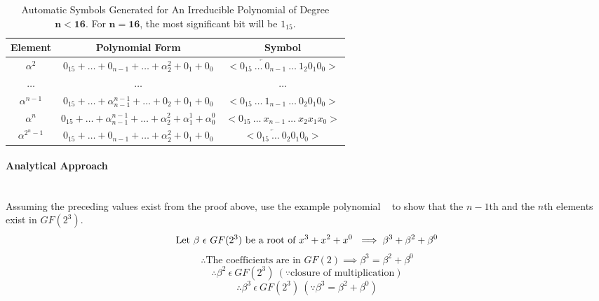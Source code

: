   \begin{table}[h]
        \def\arraystretch{2.5}
        \caption{Automatic Symbols Generated for An Irreducible Polynomial of
        Degree $\bm{n < 16}$. For $\bm{n = 16}$, the most significant bit will
        be $1_{15}$.}
        \centering
        \begin{tabular*}{450pt}{@{\extracolsep{\fill}} ccc}

        \textbf{Element} & \textbf{Polynomial Form} & \textbf{Symbol}
        \\
        \hline

        $\alpha^{2}$ & $0_{15} + \ldots + 0_{n-1} + \ldots +
        \alpha^{2}_{2} + 0_{1} + 0_{0}$ & $< \overleftarrow{0_{15} \ \ldots \
        0_{n-1}} \ \ldots \ 1_{2} 0_{1} 0_{0} >$ \\

        $\ldots$ & $\ldots$ & $\ldots$ \\

        $\alpha^{n-1}$ & $0_{15} + \ldots + \alpha^{n-1}_{n-1} + \ldots
        + 0_{2} + 0_{1} + 0_{0}$ & $< 0_{15} \ \ldots \ 1_{n-1} \ \ldots \
          0_{2} 0_{1} 0_{0} >$ \\

        $\alpha^{n}$ & $0_{15} + \ldots + \alpha^{n-1}_{n-1} + \ldots
        +\alpha^{2}_{2} + \alpha^{1}_{1} + \alpha^{0}_{0}$ & $< 0_{15} \ 
        \ldots \ x_{n-1} \ \ldots \ x_{2} x_{1} x_{0} >$ \\

        $\alpha^{2^{n}-1}$ & $0_{15} + \ldots + 0_{n-1} + \ldots +
        \alpha^{2}_{2} + 0_{1} + 0_{0}$ & $< \overleftarrow{0_{15} \ \ldots \
        0_{2}} 0_{1} 0_{0} >$ \\

        \end{tabular*}
        \label{table:auto_sym}
    \end{table}

        \paragraph{Analytical Approach} \leavevmode \\ Assuming the preceding
        values exist from the proof above, use the example polynomial
        \examplepoly~ to show that the $n-1$th and the $n$th elements exist in
        $GF(2^{3})$.
        \[ \text{Let } \beta \ \epsilon \ GF(2^{3}) \text{ be a root of
        $x^{3}+x^{2}+x^{0}$~} \implies \beta^{3} + \beta^{2} + \beta^{0} \]
        \[ \therefore \text{The coefficients are in } GF(2) \implies
        \beta^{3} = \beta^{2} + \beta^{0} \]
        \[ \therefore \beta^{2} \ \epsilon \ GF(2^{3}) \ (\because \text{
        closure of  multiplication}) \]
        \[ \therefore \beta^{3} \ \epsilon \ GF(2^{3}) \ (\because \beta^{3} =
        \beta^{2} + \beta^{0}) \]

